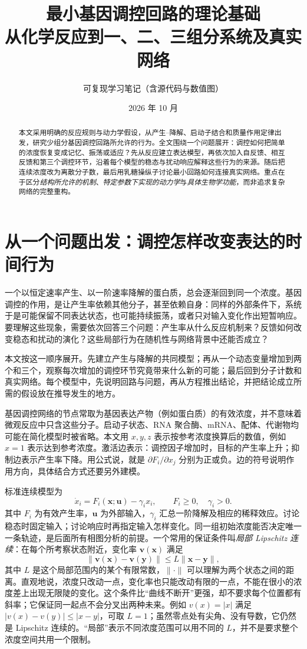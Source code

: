 \documentclass[11pt,a4paper,UTF8,fontset=fandol]{ctexart}
\title{\bfseries 最小基因调控回路的理论基础\\[4pt]\large 从化学反应到一、二、三组分系统及真实网络}
\author{可复现学习笔记（含源代码与数值图）}
\date{2026 年 10 月}
\begin{document}
\maketitle
\begin{abstract}
本文采用明确的反应规则与动力学假设，从产生--降解、启动子结合和质量作用定律出发，研究少组分基因调控回路所允许的行为。全文围绕一个问题展开：调控如何把简单的浓度恢复变成记忆、振荡或适应？先从反应建立表达模型，再依次加入自反馈、相互反馈和第三个调控环节，沿着每个模型的稳态与扰动响应解释这些行为的来源。随后把连续浓度改为离散分子数，最后用乳糖操纵子讨论最小回路如何连接真实网络。重点在于区分\emph{结构所允许的机制}、\emph{特定参数下实现的动力学}与\emph{具体生物学功能}，而非追求复杂网络的完整重构。
\end{abstract}
\newpage{\small\setlength{\parskip}{0pt}\tableofcontents}\newpage
\section{从一个问题出发：调控怎样改变表达的时间行为}
一个以恒定速率产生、以一阶速率降解的蛋白质，总会逐渐回到同一个浓度。基因调控的作用，是让产生率依赖其他分子，甚至依赖自身：同样的外部条件下，系统于是可能保留不同表达状态，也可能持续振荡，或者只对输入变化作出短暂响应。要理解这些现象，需要依次回答三个问题：产生率从什么反应机制来？反馈如何改变稳态和扰动的演化？这些局部行为在随机性与网络背景中还能否成立？

本文按这一顺序展开。先建立产生与降解的共同模型；再从一个动态变量增加到两个和三个，观察每次增加的调控环节究竟带来什么新的可能；最后回到分子计数和真实网络。每个模型中，先说明回路与问题，再从方程推出结论，并把结论成立所需的假设放在推导发生的地方。

基因调控网络的节点常取为基因表达产物（例如蛋白质）的有效浓度，并不意味着微观反应中只含这些分子。启动子状态、RNA 聚合酶、mRNA、配体、代谢物均可能在简化模型时被省略。本文用 $x,y,z$ 表示按参考浓度换算后的数值，例如 $x=1$ 表示达到参考浓度。激活边表示：调控因子增加时，目标的产生率上升；抑制边表示产生率下降。用公式说，就是 $\partial F_i/\partial x_j$ 分别为正或负。边的符号说明作用方向，具体结合方式还要另外建模。

标准连续模型为
\begin{equation}\dot x_i=F_i(\bm{x};\bm{u})-\gamma_i x_i,\qquad F_i\geq0,\quad\gamma_i>0.\end{equation}
其中 $F_i$ 为有效产生率，$\bm u$ 为外部输入，$\gamma_i$ 汇总一阶降解及相应的稀释效应。讨论稳态时固定输入；讨论响应时再指定输入怎样变化。同一组初始浓度能否决定唯一一条轨迹，是后面所有相图分析的前提。一个常用的保证条件叫\emph{局部 Lipschitz 连续}：在每个所考察状态附近，变化率 $\bm v(\bm x)$ 满足
\[
\|\bm v(\bm x)-\bm v(\bm y)\|\leq L\|\bm x-\bm y\|,
\]
其中 $L$ 是这个局部范围内的某个有限常数，$\|\cdot\|$ 可以理解为两个状态之间的距离。直观地说，浓度只改动一点，变化率也只能改动有限的一点，不能在很小的浓度差上出现无限陡的变化。这个条件比“曲线不断开”更强，却不要求每个位置都有斜率；它保证同一起点不会分叉出两种未来。例如 $v(x)=|x|$ 满足 $|v(x)-v(y)|\leq|x-y|$，可取 $L=1$；虽然零点处有尖角、没有导数，它仍然是 Lipschitz 连续的。“局部”表示不同浓度范围可以用不同的 $L$，并不是要求整个浓度空间共用一个限制。
\end{document}
